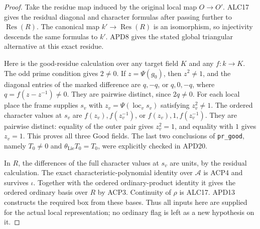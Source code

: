 \begin{proof}
Take the residue map induced by the original local map \(O\to O'\).
ALC17 gives the residual diagonal and character formulas after
passing further to \(\operatorname{Res}(R)\).  The canonical
map \(k'\to\operatorname{Res}(R)\) is an isomorphism, so
injectivity descends the same formulas to \(k'\).  APD8 gives
the stated global triangular alternative at this exact residue.

Here is the good-residue calculation over any target field \(K\)
and any \(f:k\to K\).  The odd prime condition gives
\(2\ne0\).  If \(z=\Psi(g_0)\), then \(z^2\ne1\),
and the diagonal entries of the marked difference are
\(q,-q\), or \(q,0,-q\), where \(q=f(z-z^{-1})\ne0\).
They are pairwise distinct, since \(2q\ne0\).
For each local place the frame supplies \(s_v\) with
\(z_v=\Psi(\operatorname{loc}_v s_v)\) satisfying
\(z_v^2\ne1\).  The ordered character values at \(s_v\)
are \(f(z_v),f(z_v^{-1})\), or
\(f(z_v),1,f(z_v^{-1})\).  They are pairwise distinct:
equality of the outer pair gives \(z_v^2=1\), and equality
with \(1\) gives \(z_v=1\).  This proves all three
\(\mathrm{Good}\) fields.  The last two conclusions of
\texttt{pr\_good}, namely \(T_0\ne0\) and
\(\theta_{\mathrm{Lie}}T_0=T_0\), were explicitly checked
in APD20.

In \(R\), the differences of the full character values at
\(s_v\) are units, by the residual calculation.  The exact
characteristic-polynomial identity over \(\mathcal A\) is
ACP4 and survives \(\iota\).  Together with the ordered
ordinary-product identity it gives the ordered ordinary basis
over \(R\) by ACP3.  Continuity of \(\rho\) is ALC17.
APD13 constructs the required box from these bases.  Thus all
inputs here are supplied for the actual local representation;
no ordinary flag is left as a new hypothesis on it.
\end{proof}

